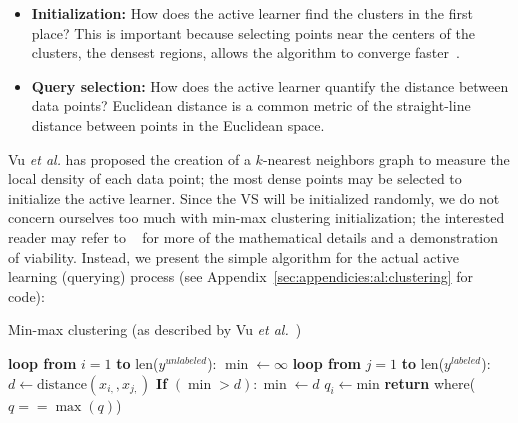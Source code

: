 \tablespacing
\begin{itemize}
	\item \textbf{Initialization:} How does the active learner find the 
	clusters in the first place? This is important because selecting points 
	near the centers of the clusters, the densest regions, allows the algorithm 
	to converge faster~\cite{vu2010}.
	\item \textbf{Query selection:} How does the active learner quantify the 
	distance between data points? Euclidean distance is a common metric of the 
	straight-line distance between points in the Euclidean space.
\end{itemize}
\bodyspacing

Vu \textit{et al.} has proposed the creation of a $k$-nearest neighbors graph 
to measure the local density of each data point; the most dense points may be 
selected to initialize the active learner. Since the VS will be initialized 
randomly, we do not concern ourselves too much with min-max clustering 
initialization; the interested reader may refer to ~\cite{vu2010} for more of 
the mathematical details and a demonstration of viability. Instead, we present 
the simple algorithm for the actual active learning (querying) process (see 
Appendix~\ref{sec:appendicies:al:clustering} for code):

\tablespacing
\begin{algorithm}[H]
	\caption{Min-max clustering (as described by 
		Vu \textit{et al.}~\cite{vu2010})}\label{euclid}
	\begin{algorithmic}[1]
		\State \textbf{loop from} $i=1$ \textbf{to} len($y^{unlabeled}$):
		\State \indent $\min \gets \infty$
		\State \indent \textbf{loop from} $j=1$ \textbf{to} len($y^{labeled}$):
		\State \indent \indent  $d \gets \text{distance}(x_{i,},x_{j,})$
		\State \indent \indent \textbf{If} $(\min >d): \min \gets d$
		\State \indent $q_i \gets \text{min}$
		\State \textbf{return} where($q==\max{(q)}$)
		\EndProcedure
	\end{algorithmic}
\end{algorithm}
\bodyspacing